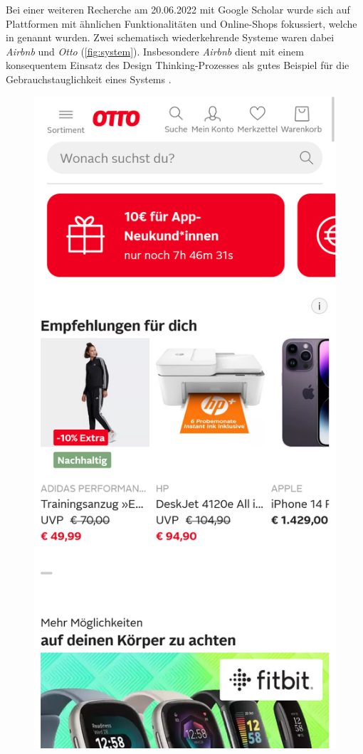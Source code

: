 Bei einer weiteren Recherche am 20.06.2022 mit Google Scholar wurde sich auf
Plattformen mit ähnlichen Funktionalitäten und Online-Shops fokussiert, welche
in  genannt wurden. Zwei schematisch
wiederkehrende Systeme waren dabei
\textit{Airbnb} \cite{airbnb2022} und
\textit{Otto} \cite{otto2022} (\ref{fig:system}).
Insbesondere \textit{Airbnb} dient mit einem konsequentem Einsatz des Design
Thinking-Prozesses als gutes Beispiel für die Gebrauchstauglichkeit eines
Systems \cite{glitza_hands_2019}.

\begin{figure}[h]
        \centering
        \includegraphics[scale=0.12]{Bilder/otto.png}

\end{figure}
